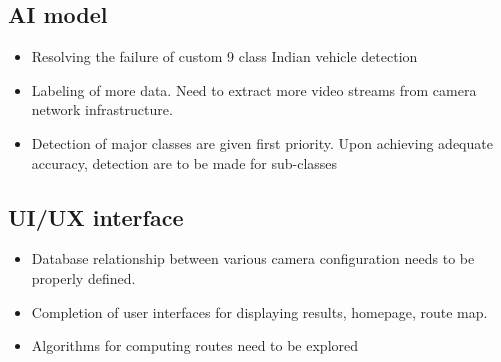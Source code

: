 \documentclass{reportFormat}
\begin{document}
	\subsection*{AI model}
	\begin{itemize}
		\item Resolving the failure of custom 9 class Indian vehicle detection
		\item Labeling of more data. Need to extract more video streams from camera network infrastructure.
		\item Detection of major classes are given first priority. Upon achieving adequate accuracy, detection are to be made for sub-classes 
	\end{itemize}
	
	\subsection*{UI/UX interface}
	\begin{itemize}
		\item Database relationship between various camera configuration needs to be properly defined.
		\item Completion of user interfaces for displaying results, homepage, route map.
		\item Algorithms for computing routes need to be explored
	\end{itemize}
	
\end{document}
